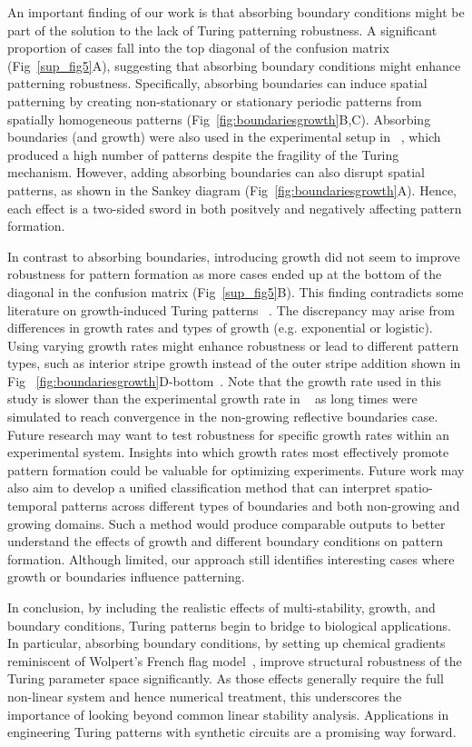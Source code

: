 \documentclass[10pt,letterpaper]{article}
\begin{document}
An important finding of our work is that absorbing boundary conditions might be part of the solution to the lack of Turing patterning robustness. A significant proportion of cases fall into the top diagonal of the confusion matrix (Fig~\ref{sup_fig5}A), suggesting that absorbing boundary conditions might enhance patterning robustness.
Specifically, absorbing boundaries can induce spatial patterning by creating non-stationary or stationary periodic patterns from spatially homogeneous patterns (Fig~\ref{fig:boundariesgrowth}B,C). Absorbing boundaries (and growth) were also used in the experimental setup in ~\parencite{Oliver2023}, which produced a high number of patterns despite the fragility of the Turing mechanism. However, adding absorbing boundaries can also disrupt spatial patterns, as shown in the Sankey diagram (Fig~\ref{fig:boundariesgrowth}A). Hence, each effect is a two-sided sword in both positvely and negatively affecting pattern formation.

In contrast to absorbing boundaries, introducing growth did not seem to improve robustness for pattern formation as more cases ended up at the bottom of the diagonal in the confusion matrix (Fig~\ref{sup_fig5}B).
This finding contradicts some literature on growth-induced Turing patterns ~\parencite{gaffney2010}.
The discrepancy may arise from differences in growth rates and types of growth (e.g. exponential or logistic).
Using varying growth rates might enhance robustness or lead to different pattern types, such as interior stripe growth instead of the outer stripe addition shown in Fig ~\ref{fig:boundariesgrowth}D-bottom~\parencite{konow2019turing}. Note that the growth rate used in this study is slower than the experimental growth rate in ~\parencite{Oliver2023} as long times were simulated to reach convergence in the non-growing reflective boundaries case. Future research may want to test robustness for specific growth rates within an experimental system. Insights into which growth rates most effectively promote pattern formation could be valuable for optimizing experiments.
Future work may also aim to develop a unified classification method that can interpret spatio-temporal patterns across different types of boundaries and both non-growing and growing domains. Such a method would produce comparable outputs to better understand the effects of growth and different boundary conditions on pattern formation.
Although limited, our approach still identifies interesting cases where growth or boundaries influence patterning.


In conclusion, by including the realistic effects of multi-stability, growth, and boundary conditions, Turing patterns begin to bridge to biological applications. In particular, absorbing boundary conditions, by setting up chemical gradients reminiscent of Wolpert's French flag model~\parencite{wolpert1969positional}, improve structural robustness of the Turing parameter space significantly. As those effects generally require the full non-linear system and hence numerical treatment, this underscores the importance of looking beyond common linear stability analysis. Applications in engineering Turing patterns with synthetic circuits are a promising way forward.
\end{document}
